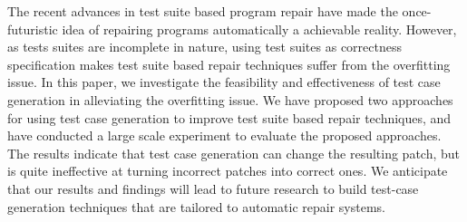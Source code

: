\documentclass[]{sig-alternate}
\begin{document}
The recent advances in test suite based program repair have made the once-futuristic idea of repairing programs automatically a achievable reality. 
However, as tests suites are incomplete in nature, using test suites as correctness specification makes test suite based repair techniques suffer from the overfitting issue. 
In this paper, we investigate the feasibility and effectiveness of test case generation in alleviating the overfitting
issue. We have proposed two approaches for using test case generation to improve test suite based repair techniques, and have conducted a large scale experiment to evaluate the proposed approaches. 
The results indicate that test case generation can change the resulting patch, but is quite ineffective at turning incorrect patches into correct ones.  
We anticipate that our results and findings will lead to future research to build test-case generation techniques that are tailored to automatic repair systems.


\newpage

\balance
 
\end{document}
